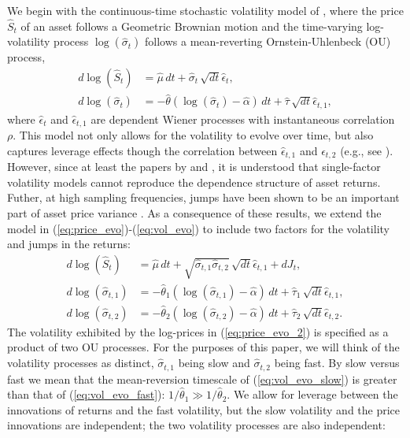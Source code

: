 We begin with the continuous-time stochastic volatility model of \cite{hull1987pricing}, where the price $\hat{S}_t$ of an asset follows a Geometric Brownian motion and the time-varying log-volatility process $\log(\hat{\sigma}_t)$ follows a mean-reverting Ornstein-Uhlenbeck (OU) process,
\begin{align}
  d\log(\hat{S}_t) &= \hat{\mu}\, dt + \hat{\sigma}_t\, \sqrt{dt} \hat{\epsilon}_{t}  ,  \label{eq:price_evo} \\
  d\log( \hat{ \sigma }_t) &= -\hat{\theta} ( \log(\hat{\sigma}_t ) - \hat{\alpha} )\, dt + \hat{\tau}\, \sqrt{dt} \hat{\epsilon}_{t,1}  ,  \label{eq:vol_evo}
\end{align}
where $\hat{\epsilon}_{t}$ and $\hat{\epsilon}_{t,1}$ are dependent Wiener processes with instantaneous correlation $\rho$.  This model not only allows for the volatility to evolve over time, but also captures leverage effects though the correlation between $\hat{\epsilon}_{t,1}$ and $\hat{\epsilon}_{t,2}$ (e.g., see \cite{black1976pricing}). However, since at least the papers by \cite{barndorff2001multifactor} and \cite{chernov2003alternative}, it is understood that single-factor volatility models cannot reproduce the dependence structure of asset returns. Futher, at high sampling frequencies, jumps have been shown to be an important part of asset price variance \cite{huang2005relative}. As a consequence of these results, we extend the model in (\ref{eq:price_evo})-(\ref{eq:vol_evo}) to include two factors for the volatility and jumps in the returns:
\begin{align}
  d\log(\hat{S}_t) &= \hat{\mu}\, dt + \sqrt{\hat{\sigma}_{t,1} \hat{\sigma}_{t,2}}\, \sqrt{dt} \hat{\epsilon}_{t,1} + dJ_t  ,   \label{eq:price_evo_2}\\
  d\log( \hat{ \sigma }_{t,1}) &= -\hat{\theta}_1 ( \log(\hat{\sigma}_{t,1} ) - \hat{\alpha} )\, dt + \hat{\tau}_1\, \sqrt{dt} \hat{\epsilon}_{t,1}  , \label{eq:vol_evo_slow} \\
  d\log( \hat{ \sigma }_{t,2}) &= -\hat{\theta}_2 ( \log(\hat{\sigma}_{t,2} ) - \hat{\alpha} )\, dt + \hat{\tau}_2\, \sqrt{dt} \hat{\epsilon}_{t,2}  . \label{eq:vol_evo_fast}
\end{align}
The volatility exhibited by the log-prices in (\ref{eq:price_evo_2}) is specified as a product of two OU processes. For the purposes of this paper, we will think of the volatility processes as distinct, $\hat{\sigma}_{t,1}$ being slow and $\hat{\sigma}_{t,2}$ being fast. By slow versus fast we mean that the mean-reversion timescale of (\ref{eq:vol_evo_slow}) is greater than that of (\ref{eq:vol_evo_fast}): $1/\hat{\theta}_1 \gg 1/\hat{\theta}_2$. We allow for leverage between the innovations of returns and the fast volatility, but the slow volatility and the price innovations are independent; the two volatility processes are also independent:

